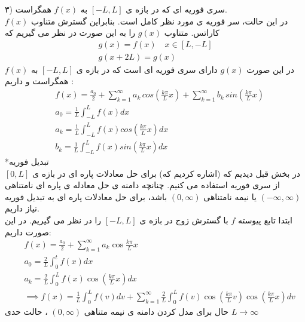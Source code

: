 ۳) سری فوریه ای که در بازه ی
$[-L,L]$
به
$f(x)$
همگراست.\\
در این حالت، سر فوریه ی مورد نظر کامل است. بنابراین گسترش متناوب
$f(x)$
کاراتس. متناوب 
$g(x)$
را به این صورت در نظر می گیریم که
\begin{equation*}
	\begin{gathered}
		g(x)=f(x)\quad x\in[L,-L] \\g(x+2L)=g(x)
	\end{gathered}
\end{equation*}
در این صورت 
$g(x)$
دارای سری فوریه ای است که در بازه ی
$[-L,L]$
به 
$f(x)$
همگراست و داریم :
\begin{equation*}
	\begin{aligned}
		{} &\
		f(x)=\frac{a_0}{2}+\sum_{k=1}^\infty{a_k \, cos\left(\frac{k\pi}{L}x\right)}+\sum_{k=1}^\infty{b_k \, sin\left(\frac{k\pi}{L}x\right)}
		\\ &\
		a_0=\frac{1}{L}\int_{-L}^{L}{f(x)dx}
		\\ &\
		a_k=\frac{1}{L}\int_{-L}^L{f(x)cos\left(\frac{k\pi}{L}x\right)dx}
		\\ &\
		b_k=\frac{1}{L}\int_{-L}^L{f(x)sin\left(\frac{k\pi}{L}x\right)dx}
	\end{aligned}
\end{equation*}
*تبدیل فوریه\\
در بخش قبل دیدیم که (اشاره کردیم که) برای حل معادلات پاره ای در بازه ی
$[0,L]$
از سری فوریه استفاده می کنیم. چنانچه دامنه ی حل معادله ی پاره ای نامتناهی
$(-\infty,\infty)$
یا نیمه نامتناهی
$(0,\infty)$
باشد، برای حل معادلات پاره ای به تبدیل فوریه نیاز داریم.\\
ابتدا تابع پیوسته
$f$
با گسترش زوج در بازه ی
$[-L,L]$
را در نظر می گیریم. در این صورت داریم:
\begin{equation*}
	\begin{aligned}
		{} &\
		f(x)=\frac{a_{0}}{2}+\sum_{k=1}^{\infty} a_{k} \cos \frac{k \pi}{L} x
		\\ &\
		a_{0}=\frac{2}{L} \int_{0}^{t} f(x) d x
		\\ &\
		a_{k}=\frac{2}{L} \int_{0}^{L} f(x) \cos \left(\frac{k \pi}{L} x\right) d x
		\\ &\
		\implies f(x) = \frac{1}{L} \int_{0}^{L} {f(v) dv}+\sum_{k=1}^{\infty} {\frac{2}{L} \int_{0}^{L} {f(v) \cos \left(\frac{k \pi}{L} v\right) \cos \left(\frac{k \pi}{L} x\right) d v}}
	\end{aligned}
\end{equation*}
حال برای مدل کردن دامنه ی نیمه متناهی 
$(0,\infty)$
، حالت حدی 
$L\to \infty$
